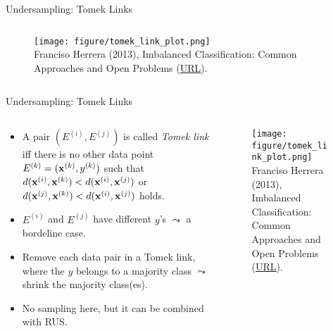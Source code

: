 \documentclass[11pt,compress,t,notes=noshow, xcolor=table]{beamer}
\begin{document}
\begin{frame}{Undersampling: Tomek Links}
{\begin{columns}
            \begin{column}{0.4\textwidth}
                \begin{figure}
                    \centering
                    \texttt{[image: figure/tomek\_link\_plot.png]}	
                    \tiny
                    \\ Franciso Herrera (2013), Imbalanced Classification: Common
                    Approaches and Open Problems (\href{https://sci2s.ugr.es/sites/default/files/files/TutorialsAndPlenaryTalks/SSTiC-Trends in-Classification-Imbalanced-data-sets.pdf}{\underline{URL}}).
                \end{figure}
            \end{column}
        \end{columns}
   }
\end{frame}

 \begin{frame}{Undersampling: Tomek Links}

    \begin{columns}
        \begin{column}{0.59\textwidth}
            \begin{itemize} 
                
                 \item A pair $(E^{(i)},E^{(j)})$ is called \emph{Tomek link} iff there is no other data point $E^{(k)} = (\mathbf{x}^{(k)},y^{(k)})$ such that $d(\mathbf{x}^{(i)}, \mathbf{x}^{(k)}) < d(\mathbf{x}^{(i)}, \mathbf{x}^{(j)}) $ or $d(\mathbf{x}^{(j)}, \mathbf{x}^{(k)}) < d(\mathbf{x}^{(i)}, \mathbf{x}^{(j)}) $ holds.
                
                \item $E^{(i)}$ and $E^{(j)}$ have different $y$'s $\leadsto$ a bordeline case.

            
                \item Remove each data pair in a Tomek link, where the $y$ belongs to a majority class $\leadsto$ shrink the majority class(es).


                \item No sampling here, but it can be combined with RUS.

            
            \end{itemize}
        \end{column}

        \begin{column}{0.4\textwidth}
            \begin{figure}
                \centering
                \texttt{[image: figure/tomek\_link\_plot.png]}	\tiny
                \\ Franciso Herrera (2013), Imbalanced Classification: Common
                Approaches and Open Problems (\href{https://sci2s.ugr.es/sites/default/files/files/TutorialsAndPlenaryTalks/SSTiC-Trends in-Classification-Imbalanced-data-sets.pdf}{\underline{URL}}).
            \end{figure}
        \end{column}
    \end{columns}

\end{frame}
	
\end{document}
